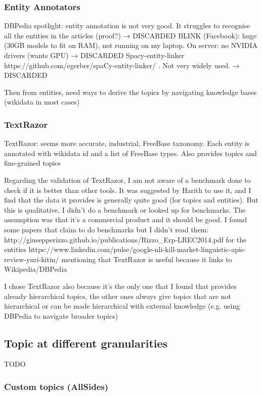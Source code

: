 \subsubsection{Entity Annotators}
DBPedia spotlight: entity annotation is not very good. It struggles to recognise all the entities in the articles (proof?) → DISCARDED
BLINK (Facebook): huge (30GB models to fit on RAM), not running on my laptop. On server: no NVIDIA drivers (wants GPU) → DISCARDED
Spacy-entity-linker https://github.com/egerber/spaCy-entity-linker/ . Not very widely used. → DISCARDED

Then from entities, need ways to derive the topics by navigating knowledge bases (wikidata in most cases)

\subsubsection{TextRazor}
TextRazor: seems more accurate, industrial, FreeBase taxonomy. Each entity is annotated with wikidata id and a list of FreeBase types. Also provides topics and fine-grained topics

Regarding the validation of TextRazor, I am not aware of a benchmark done to check if it is better than other tools. It was suggested by Harith to use it, and I find that the data it provides is generally quite good (for topics and entities). But this is qualitative, I didn’t do a benchmark or looked up for benchmarks. The assumption was that it’s a commercial product and it should be good.
I found some papers that claim to do benchmarks but I didn’t read them:
http://giusepperizzo.github.io/publications/Rizzo\_Erp-LREC2014.pdf for the entities
https://www.linkedin.com/pulse/google-nli-kill-market-linguistic-apis-review-yuri-kitin/ mentioning that TextRazor is useful because it links to Wikipedia/DBPedia

I chose TextRazor also because it’s the only one that I found that provides already hierarchical topics, the other ones always give topics that are not hierarchical or can be made hierarchical with external knowledge (e.g. using DBPedia to navigate broader topics)

\subsection{Topic at different granularities}

TODO

\subsubsection{Custom topics (AllSides)}

